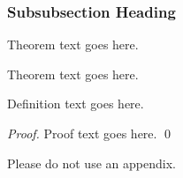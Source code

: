 \documentclass[graybox]{svmult}
\begin{document}
\subsubsection{Subsubsection Heading}

\begin{theorem}
Theorem text goes here.
\end{theorem}

\begin{theorem} 
Theorem text goes here.
\end{theorem}
%
%
\begin{definition}
Definition text goes here.
\end{definition}

\begin{proof}
Proof text goes here.
\qed
\end{proof}

%
\begin{acknowledgement}

\end{acknowledgement}
%

Please do not use an appendix.

\bigskip
%


%
\end{document}
